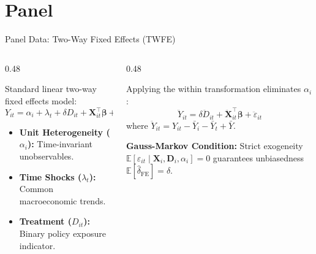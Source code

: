 \documentclass[aspectratio=169, 9pt]{beamer}
\begin{document}
\section{Panel}
\begin{frame}{Panel Data: Two-Way Fixed Effects (TWFE)}
    \begin{columns}[t]
        \begin{column}{0.48\textwidth}
            \par\vspace{0.2em}
            \scriptsize
            Standard linear two-way fixed effects model:
            \begin{equation*}
                Y_{it} = \alpha_i + \lambda_t + \delta D_{it} + \mathbf{X}_{it}^\top \boldsymbol{\beta} + \varepsilon_{it}
            \end{equation*}
            \vspace{0.1em}
            \begin{itemize}\setlength{\itemsep}{2pt}
                \item \textbf{Unit Heterogeneity ($\alpha_i$):} Time-invariant unobservables.
                \item \textbf{Time Shocks ($\lambda_t$):} Common macroeconomic trends.
                \item \textbf{Treatment ($D_{it}$):} Binary policy exposure indicator.
            \end{itemize}
        \end{column}
        \begin{column}{0.48\textwidth}
            \par\vspace{0.2em}
            \scriptsize
            Applying the within transformation eliminates $\alpha_i$:
            \begin{equation*}
                \ddot{Y}_{it} = \delta \ddot{D}_{it} + \ddot{\mathbf{X}}_{it}^\top \boldsymbol{\beta} + \ddot{\varepsilon}_{it}
            \end{equation*}
            where $\ddot{Y}_{it} = Y_{it} - \bar{Y}_i - \bar{Y}_t + \bar{Y}$.
            \vspace{0.2em}
            \begin{takeaway}
                \textbf{Gauss-Markov Condition:} Strict exogeneity $\mathbb{E}[\varepsilon_{it} \mid \mathbf{X}_i, \mathbf{D}_i, \alpha_i] = 0$ guarantees unbiasedness $\mathbb{E}[\hat{\delta}_{\mathrm{FE}}] = \delta$.
            \end{takeaway}
        \end{column}
    \end{columns}
\end{frame}
\end{document}

